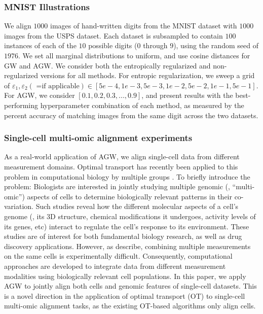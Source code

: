 \subsubsection{MNIST Illustrations} We align $1000$ images of hand-written digits from
the MNIST dataset with $1000$ images from the USPS dataset. Each dataset is subsampled to
contain $100$ instances of each of the $10$ possible digits ($0$ through $9$),
using the random seed of $1976$. We set all marginal distributions to uniform,
and use cosine distances for GW and AGW. We consider both the entropically regularized and
non-regularized versions for all methods. For entropic regularization, we sweep a grid of
$\varepsilon_1, \varepsilon_2 (\textrm{ =if applicable}) \in [5e-4, 1e-3, 5e-3, 1e-2, 5e-2, 1e-1, 5e-1]$.
For AGW, we consider $[0.1, 0.2, 0.3, ..., 0.9]$, and present results with the best-performing
hyperparameter combination of each method, as measured by the percent accuracy of matching images
from the same digit across the two datasets.

\subsubsection{Single-cell multi-omic alignment experiments}

As a real-world application of AGW, we align single-cell data from different measurement domains.
Optimal transport has recently been applied to this problem in computational biology by
multiple groups \citep{Demetci20, Pamona, UniPort}. To briefly introduce the problem:
Biologists are interested in jointly studying multiple genomic (\ie, ``multi-omic'')
aspects of cells to determine biologically relevant patterns in their co-variation.
Such studies reveal how the different molecular aspects of a cell's genome (\eg,
its 3D structure, chemical modifications it undergoes, activity levels of its genes, etc)
interact to regulate the cell's response to its environment. These studies are of interest
for both fundamental biology research, as well as drug discovery applications. However,
as \citep{liu_et_al:LIPIcs:2019:11040} describe, combining multiple measurements on the
same cells is experimentally difficult. Consequently, computational approaches are developed
to integrate data from different measurement modalities using biologically relevant cell populations.
In this paper, we apply AGW to jointly align both cells and genomic features of single-cell datasets.
This is a novel direction in the application of optimal transport (OT) to
single-cell multi-omic alignment tasks, as the existing OT-based algorithms only align cells.


